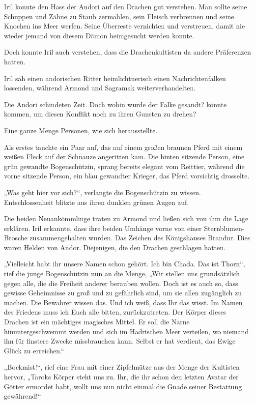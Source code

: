 Iril konnte den Hass der Andori auf den Drachen gut verstehen. Man sollte seine Schuppen und Zähne zu Staub zermahlen, sein Fleisch verbrennen und seine Knochen ins Meer werfen. Seine Überreste vernichten und verstreuen, damit nie wieder jemand von diesem Dämon heimgesucht werden konnte.

Doch konnte Iril auch verstehen, dass die Drachenkultisten da andere Präferenzen hatten.

Iril sah einen andorischen Ritter heimlichtuerisch einen Nachrichtenfalken lossenden, während Armond und Sagramak weiterverhandelten.

Die Andori schindeten Zeit. Doch wohin wurde der Falke gesandt? könnte kommen, um diesen Konflikt noch zu ihren Gunsten zu drehen?

Eine ganze Menge Personen, wie sich herausstellte.

Als erstes tauchte ein Paar auf, das auf einem großen braunen Pferd mit einem weißen Fleck auf der Schnauze angeritten kam. Die hinten sitzende Person, eine grün gewandte Bogenschützin, sprang bereits elegant vom Reittier, während die vorne sitzende Person, ein blau gewandter Krieger, das Pferd vorsichtig drosselte.

„Was geht hier vor sich?“, verlangte die Bogenschützin zu wissen. Entschlossenheit blitzte aus ihren dunklen grünen Augen auf.

Die beiden Neuankömmlinge traten zu Armond und ließen sich von ihm die Lage erklären. Iril erkannte, dass ihre beiden Umhänge vorne von einer Sternblumen-Brosche zusammengehalten wurden. Das Zeichen des Königshauses Brandur. Dies waren Helden von Andor. Diejenigen, die den Drachen geschlagen hatten.

„Vielleicht habt ihr unsere Namen schon gehört. Ich bin Chada. Das ist Thorn“, rief die junge Bogenschützin nun an die Menge, „Wir stellen uns grundsätzlich gegen alle, die die Freiheit anderer berauben wollen. Doch ist es auch so, dass gewisse Geheimnisse zu groß und zu gefährlich sind, um sie allen zugänglich zu machen. Die Bewahrer wissen das. Und ich weiß, dass Ihr das wisst. Im Namen des Friedens muss ich Euch alle bitten, zurückzutreten. Der Körper dieses Drachen ist ein mächtiges magisches Mittel. Er soll die Narne hinuntergeschwemmt werden und sich im Hadrischen Meer verteilen, wo niemand ihn für finstere Zwecke missbrauchen kann. Selbst er hat verdient, das Ewige Glück zu erreichen.“

„Bockmist!“, rief eine Frau mit einer Zipfelmütze aus der Menge der Kultisten hervor, „Taroks Körper steht uns zu. Ihr, die ihr schon den letzten Avatar der Götter ermordet habt, wollt uns nun nicht einmal die Gnade seiner Bestattung gewährend!“

